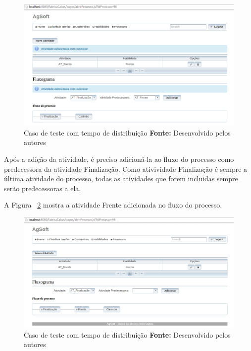 \begin{figure}[h!]
	\centerline{\includegraphics[scale=0.3]{./imagens/adiconar_atividade_frente_teste5.png}}
	\caption[Caso de teste com tempo de distribuição]
	{Caso de teste com tempo de distribuição \textbf{Fonte:} Desenvolvido pelos autores}
	\label{fig:add_frente_teste5}
\end{figure}

\par Após a adição da atividade, é preciso adicioná-la ao fluxo do processo como
predecessora da atividade Finalização. Como ativividade Finalização é sempre a
última atividade do processo, todas as atividades que forem incluidas sempre
serão predecessoras a ela.
\par A Figura ~\ref{fig:add_frente_teste4} mostra a atividade Frente adicionada
no fluxo do processo.

\newpage

\begin{figure}[h!]
	\centerline{\includegraphics[scale=0.3]{./imagens/adicionar_atividade_frente_teste4.png}}
	\caption[Caso de teste com tempo de distribuição]
	{Caso de teste com tempo de distribuição \textbf{Fonte:} Desenvolvido pelos autores}
	\label{fig:add_frente_teste4}
\end{figure}


